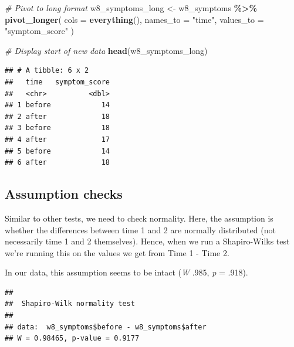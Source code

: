\documentclass[
]{book}
\newenvironment{Shaded}{\begin{snugshade}}{\end{snugshade}}
\newcommand{\AttributeTok}[1]{\textcolor[rgb]{0.13,0.29,0.53}{#1}}
\newcommand{\CommentTok}[1]{\textcolor[rgb]{0.56,0.35,0.01}{\textit{#1}}}
\newcommand{\FunctionTok}[1]{\textcolor[rgb]{0.13,0.29,0.53}{\textbf{#1}}}
\newcommand{\NormalTok}[1]{#1}
\newcommand{\OtherTok}[1]{\textcolor[rgb]{0.56,0.35,0.01}{#1}}
\newcommand{\SpecialCharTok}[1]{\textcolor[rgb]{0.81,0.36,0.00}{\textbf{#1}}}
\newcommand{\StringTok}[1]{\textcolor[rgb]{0.31,0.60,0.02}{#1}}
\begin{document}
\begin{Shaded}
\begin{Highlighting}[]
\CommentTok{\# Pivot to long format}
\NormalTok{w8\_symptoms\_long }\OtherTok{\textless{}{-}}\NormalTok{ w8\_symptoms }\SpecialCharTok{\%\textgreater{}\%}
  \FunctionTok{pivot\_longer}\NormalTok{(}
    \AttributeTok{cols =} \FunctionTok{everything}\NormalTok{(),}
    \AttributeTok{names\_to =} \StringTok{"time"}\NormalTok{,}
    \AttributeTok{values\_to =} \StringTok{"symptom\_score"}
\NormalTok{  )}

\CommentTok{\# Display start of new data}
\FunctionTok{head}\NormalTok{(w8\_symptoms\_long)}
\end{Highlighting}
\end{Shaded}

\begin{verbatim}
## # A tibble: 6 x 2
##   time   symptom_score
##   <chr>          <dbl>
## 1 before            14
## 2 after             18
## 3 before            18
## 4 after             17
## 5 before            14
## 6 after             18
\end{verbatim}

\subsection{Assumption checks}\label{assumption-checks-2}

Similar to other tests, we need to check normality. Here, the assumption is whether the differences between time 1 and 2 are normally distributed (not necessarily time 1 and 2 themselves). Hence, when we run a Shapiro-Wilks test we're running this on the values we get from Time 1 - Time 2.

In our data, this assumption seems to be intact (\emph{W} .985, \emph{p} = .918).

\begin{Shaded}
\end{Shaded}

\begin{verbatim}
## 
##  Shapiro-Wilk normality test
## 
## data:  w8_symptoms$before - w8_symptoms$after
## W = 0.98465, p-value = 0.9177
\end{verbatim}
\end{document}

